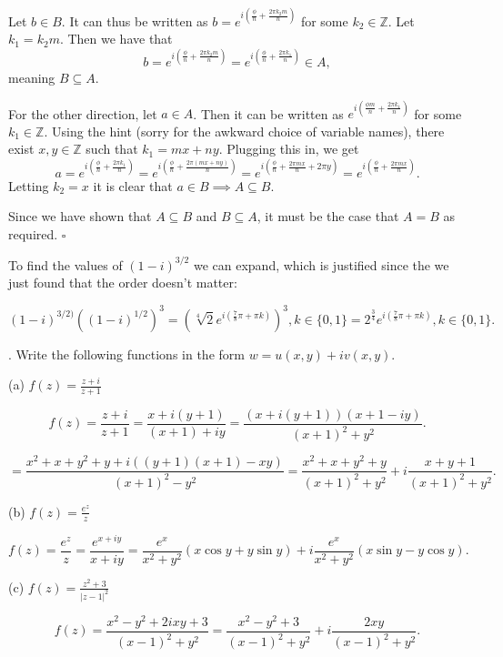 \documentclass[letterpaper, reqno,11pt]{article}
\begin{document}
Let $b\in B$. It can thus be written as  $b=e^{i\left( \frac{\phi}{n}+\frac{2\pi k_2 m}{n} \right) }$ for some $k_2\in\mathbb{Z}$. Let $ k_1=k_2m$. Then we have that 
\[
b=e^{i\left( \frac{\phi}{n}+\frac{2\pi k_2 m}{n} \right) }=e^{i\left( \frac{\phi}{n}+\frac{2\pi k_1}{n} \right) }\in A
,\]
meaning $B\subseteq A$. 

For the other direction, let $a\in A$. Then it can be written as $e^{i\left( \frac{\phi m}{n}+\frac{2\pi k_1}{n} \right) }$ for some $k_1\in\mathbb{Z}$. Using the hint (sorry for the awkward choice of variable names), there exist $x, y\in\mathbb{Z}$ such that $k_1=mx+ny$. Plugging this in, we get 
\[
a=e^{i\left( \frac{\phi}{n}+\frac{2\pi k_1}{n} \right) }=e^{i\left( \frac{\phi}{n}+\frac{2\pi (mx+ny)}{n} \right) }=e^{i\left( \frac{\phi}{n}+\frac{2\pi mx}{n}+2\pi y \right) }=e^{i\left( \frac{\phi}{n}+\frac{2\pi mx}{n} \right) }
.\]
Letting $k_2=x$ it is clear that $a\in B\implies A\subseteq B$. 

Since we have shown that $A\subseteq B$ and $B\subseteq A$, it must be the case that $A=B$ as required. $\square$

To find the values of $(1-i)^{3 /2}$ we can expand, which is justified since the we just found that the order doesn't matter: 

\[
    (1-i)^{3 /2)}\left( (1-i)^{1 /2} \right)^3=\left(\sqrt[4]{2} e^{i\left( \frac{7}{8}\pi+\pi k \right) }\right)^3, k\in \{0, 1\} =2^{\frac{3}{4}}e^{i\left( \frac{7}{8}\pi+\pi k \right) }, k\in \{0, 1\} 
.\]

\medskip

. Write the following functions in the form $w= u(x, y)+ i v(x, y)$.

(a) $ f(z)= \frac{z+i}{z+1}$

\[
f(z)=\frac{z+i}{z+1}=\frac{x+i(y+1)}{(x+1)+iy}=\frac{(x+i(y+1))(x+1-iy)}{(x+1)^2+y^2}
.\]

\[
=\frac{x^2+x+y^2+y+i((y+1)(x+1)-xy)}{(x+1)^2-y^2}=\frac{x^2+x+y^2+y}{(x+1)^2+y^2}+i \frac{x+y+1}{(x+1)^2+y^2}
.\]

(b) $ f(z)= \frac{ e^z}{ z}$

\[
f(z)=\frac{e^z}{z}=\frac{e^{x+iy}}{x+iy}=\frac{e^{x}}{x^2+y^2}\left( x\cos y+y\sin y \right)+i\frac{e^{x}}{x^2+y^2} \left( x\sin y-y\cos y \right) 
.\]

(c) $ f(z)= \frac{ z^2+3}{|z-1|^2} $

\[
f(z)=\frac{x^2-y^2+2ixy+3}{(x-1)^2+y^2}=\frac{x^2-y^2+3}{(x-1)^2+y^2}+i \frac{2xy}{(x-1)^2+y^2}
.\]

\medskip
\end{document}
